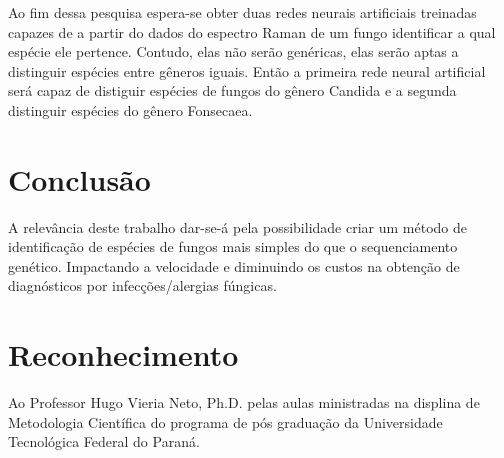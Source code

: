 \documentclass[conference,peerreview]{IEEEtran}
\begin{document}
Ao fim dessa pesquisa espera-se obter duas redes neurais artificiais treinadas capazes de a partir do dados do espectro Raman de um fungo identificar a qual espécie ele pertence. Contudo, elas não serão genéricas, elas serão aptas a distinguir espécies entre gêneros iguais. Então a primeira rede neural artificial será capaz de distiguir espécies de fungos do gênero Candida e a segunda distinguir espécies do gênero Fonsecaea. 

\section{Conclusão}
 
A relevância deste trabalho dar-se-á pela possibilidade criar um método de identificação de espécies de fungos mais simples do que o sequenciamento genético. Impactando a velocidade e diminuindo os custos na obtenção de diagnósticos por infecções/alergias fúngicas. 

\section*{Reconhecimento}

Ao Professor Hugo Vieria Neto, Ph.D. pelas aulas ministradas na displina de Metodologia Científica do programa de pós graduação da Universidade Tecnológica Federal do Paraná.



\end{document}
